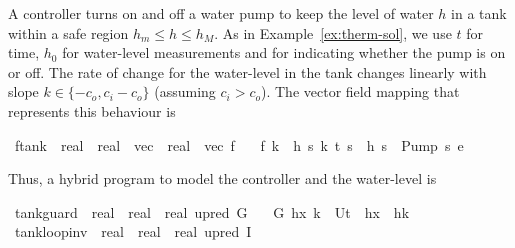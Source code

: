 \documentclass[envcountsame,envcountsect]{llncs}
\begin{document}
\begin{example}\label{ex:tank-inv}
A controller turns on and off a water pump to keep the level of water $h$ in a tank within a safe region $h_m\leq h\leq h_M$. As in Example~\ref{ex:therm-sol}, we use $t$ for time, $h_0$ for water-level measurements and  for indicating whether the pump is on or off. The rate of change for the water-level in the tank changes linearly with slope $k\in\{-c_o,c_i-c_o\}$ (assuming $c_i>c_o$). The vector field mapping that represents this behaviour is
\begin{isabellebody}
\isanewline
{}\isamarkupfalse%
\ ftank\ {\isacharcolon}{\isacharcolon}\ {\isachardoublequoteopen}real\ {\isasymRightarrow}\ {\isacharparenleft}real{\isacharcomma}\ {}{\isacharparenright}\ vec\ {\isasymRightarrow}\ {\isacharparenleft}real{\isacharcomma}\ {}{\isacharparenright}\ vec{\isachardoublequoteclose}\ {\isacharparenleft}{\isachardoublequoteopen}f{\isachardoublequoteclose}{\isacharparenright}\isanewline
\ \ \ {\isachardoublequoteopen}f\ k\ {\isasymequiv}\ {\isasymlbrakk}{\isacharbrackleft}h\ {\isasymmapsto}\isactrlsub s\ k{\isacharcomma}\ t\ {\isasymmapsto}\isactrlsub s\ {}{\isacharcomma}\ h\ {\isasymmapsto}\isactrlsub s\ {}{\isacharcomma}\ Pump\ {\isasymmapsto}\isactrlsub s\ {}{\isacharbrackright}{\isasymrbrakk}\isactrlsub e{\isachardoublequoteclose}\isanewline
\end{isabellebody}
\noindent Thus, a hybrid program to model the controller and the water-level is
\begin{isabellebody}
\isanewline
{}\isamarkupfalse%
\ tank{\isacharunderscore}guard\ {\isacharcolon}{\isacharcolon}\ {\isachardoublequoteopen}real\ {\isasymRightarrow}\ real\ {\isasymRightarrow}\ {\isacharparenleft}real{\isacharcircum}{}{\isacharparenright}\ upred{\isachardoublequoteclose}\ {\isacharparenleft}{\isachardoublequoteopen}G{\isachardoublequoteclose}{\isacharparenright}\isanewline
\ \ \ {\isachardoublequoteopen}G\ h\isactrlsub x\ k\ {\isasymequiv}\ U{\isacharparenleft}t\ {\isasymle}\ {\isacharparenleft}h\isactrlsub x\ {\isacharminus}\ hk{\isacharparenright}{\isachardoublequoteclose}\isanewline
\isanewline
{}\isamarkupfalse%
\ tank{\isacharunderscore}loop{\isacharunderscore}inv\ {\isacharcolon}{\isacharcolon}\ {\isachardoublequoteopen}real\ {\isasymRightarrow}\ real\ {\isasymRightarrow}\ {\isacharparenleft}real{\isacharcircum}{}{\isacharparenright}\ upred{\isachardoublequoteclose}\ {\isacharparenleft}{\isachardoublequoteopen}I{\isachardoublequoteclose}{\isacharparenright}\isanewline

\end{isabellebody}
\end{example}
\end{document}

